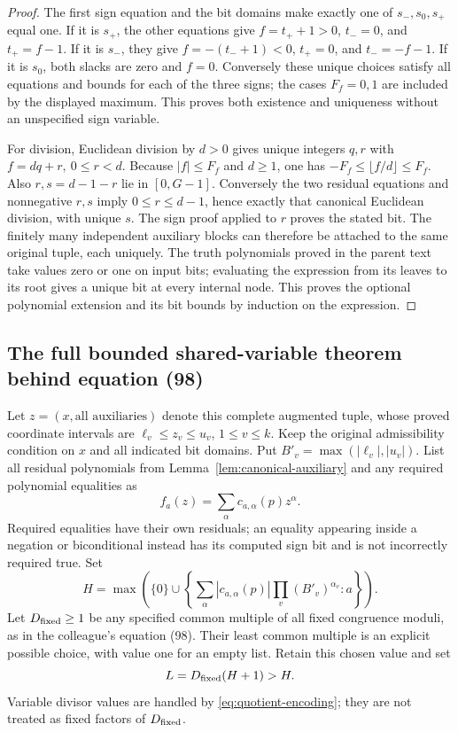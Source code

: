 \begin{proof}
The first sign equation and the bit domains make exactly one
of \(s_-,s_0,s_+\) equal one.  If it is \(s_+\), the
other equations give \(f=t_++1>0\), \(t_-=0\), and
\(t_+=f-1\).  If it is \(s_-\), they give
\(f=-(t_-+1)<0\), \(t_+=0\), and \(t_-=-f-1\).
If it is \(s_0\), both slacks are zero and \(f=0\).
Conversely these unique choices satisfy all equations and
bounds for each of the three signs; the cases \(F_f=0,1\)
are included by the displayed maximum.  This proves both
existence and uniqueness without an unspecified sign variable.

For division, Euclidean division by \(d>0\) gives unique
integers \(q,r\) with \(f=dq+r,\ 0\le r<d\).
Because \(|f|\le F_f\) and \(d\ge1\), one has
\(-F_f\le\lfloor f/d\rfloor\le F_f\).
Also \(r,s=d-1-r\) lie in \([0,G-1]\).
Conversely the two residual equations and nonnegative
\(r,s\) imply \(0\le r\le d-1\), hence exactly that
canonical Euclidean division, with unique \(s\).
The sign proof applied to \(r\) proves the stated bit.
The finitely many independent auxiliary blocks can therefore
be attached to the same original tuple, each uniquely.
The truth polynomials proved in the parent text take values
zero or one on input bits; evaluating the expression from
its leaves to its root gives a unique bit at every internal
node.  This proves the optional polynomial extension and
its bit bounds by induction on the expression.
\end{proof}

\subsection{The full bounded shared-variable theorem behind equation (98)}

Let \(z=(x,\text{all auxiliaries})\) denote this complete
augmented tuple, whose proved coordinate intervals are
\(\ell_v\le z_v\le u_v\), \(1\le v\le k\).
Keep the original admissibility condition on \(x\) and
all indicated bit domains.  Put
\(B'_v=\max(|\ell_v|,|u_v|)\).
List all residual polynomials from
Lemma~\ref{lem:canonical-auxiliary} and any required
polynomial equalities as
\[
 f_a(z)=\sum_\alpha c_{a,\alpha}(p)z^\alpha.
\]
Required equalities have their own residuals; an equality
appearing inside a negation or biconditional instead has
its computed sign bit and is not incorrectly required true.
Set
\begin{equation}\label{eq:shared-residual-bound}
 H=\max\left(\{0\}\cup
   \left\{\sum_\alpha|c_{a,\alpha}(p)|
                  \prod_v(B'_v)^{\alpha_v}:a\right\}\right).
\end{equation}
Let \(D_{\rm fixed}\ge1\) be any specified common multiple of
all fixed congruence moduli, as in the colleague's equation (98).
Their least common multiple is an explicit possible choice,
with value one for an empty list.  Retain this chosen value and set
\[
 L=D_{\rm fixed}(H+1)>H.
\]
Variable divisor values are handled by
\eqref{eq:quotient-encoding}; they are not treated as
fixed factors of \(D_{\rm fixed}\).

